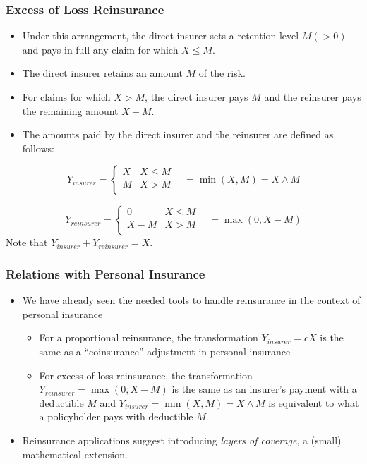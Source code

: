 \documentclass{beamer}
\begin{document}
\begin{frame}%
\frametitle{Excess of Loss Reinsurance}
\begin{itemize}
\item Under this arrangement, the direct insurer sets a retention level $M (>0)$ and pays in full any claim for which $X  \le M$.
\item The direct insurer retains an amount $M$ of the risk.
\item For claims for which $X > M$, the direct insurer pays $M$ and the reinsurer pays the remaining amount $X-M$.
\item The amounts paid by the direct insurer and the reinsurer are defined as follows:
\end{itemize}
$$
Y_{insurer} =
\begin{cases}
X & X \le M\\
M & X >M \\
\end{cases} \ \ \ \ = \min(X,M) = X \wedge M
$$

$$
Y_{reinsurer} =
\begin{cases}
0 & X \le M\\
X- M & X >M \\
\end{cases} \ \ \ \  = \max(0,X-M)
$$
Note that $Y_{insurer}+Y_{reinsurer}=X$.
\end{frame}

\begin{frame}%
\frametitle{Relations with Personal Insurance}
\begin{itemize}
\item We have already seen the needed tools to handle reinsurance in the context of personal insurance
\begin{itemize}
\item For a proportional reinsurance, the transformation  $Y_{insurer} = c X $ is the same as a ``coinsurance'' adjustment in personal insurance
\item For excess of loss reinsurance, the transformation $Y_{reinsurer} = \max(0,X-M)$ is the same as an insurer's payment with a deductible $M$ and $Y_{insurer} = \min(X,M) = X \wedge M$ is equivalent to what a policyholder pays with deductible $M$.
\end{itemize}
\item Reinsurance applications suggest introducing \textit{layers of coverage}, a (small) mathematical extension.
\end{itemize}
\end{frame}
\end{document}
